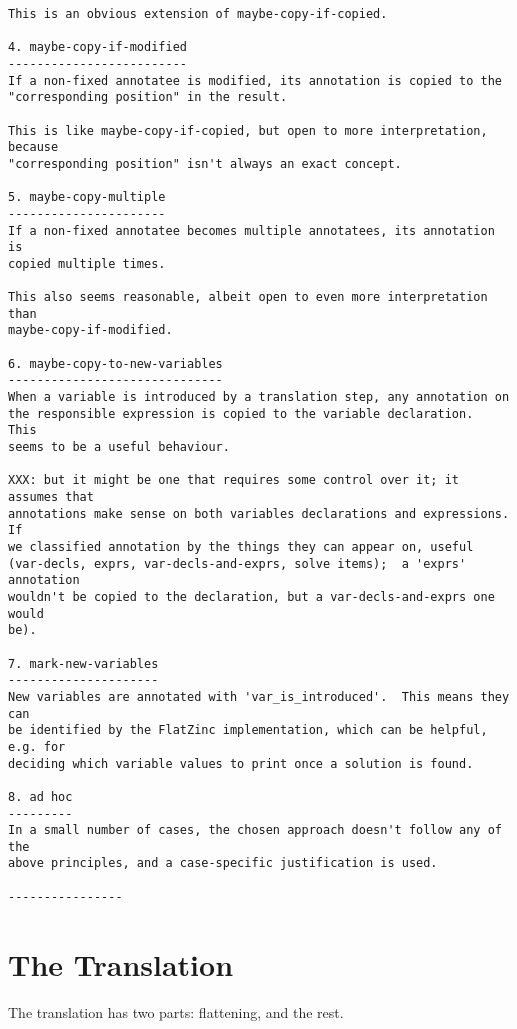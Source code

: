 \documentclass[10pt]{article}
\begin{document}
\begin{verbatim}
This is an obvious extension of maybe-copy-if-copied.

4. maybe-copy-if-modified
-------------------------
If a non-fixed annotatee is modified, its annotation is copied to the
"corresponding position" in the result.

This is like maybe-copy-if-copied, but open to more interpretation, because
"corresponding position" isn't always an exact concept.

5. maybe-copy-multiple
----------------------
If a non-fixed annotatee becomes multiple annotatees, its annotation is
copied multiple times.

This also seems reasonable, albeit open to even more interpretation than
maybe-copy-if-modified.

6. maybe-copy-to-new-variables
------------------------------
When a variable is introduced by a translation step, any annotation on
the responsible expression is copied to the variable declaration.  This
seems to be a useful behaviour.

XXX: but it might be one that requires some control over it; it assumes that
annotations make sense on both variables declarations and expressions.  If
we classified annotation by the things they can appear on, useful
(var-decls, exprs, var-decls-and-exprs, solve items);  a 'exprs' annotation
wouldn't be copied to the declaration, but a var-decls-and-exprs one would
be).

7. mark-new-variables
---------------------
New variables are annotated with 'var_is_introduced'.  This means they can
be identified by the FlatZinc implementation, which can be helpful, e.g. for
deciding which variable values to print once a solution is found.

8. ad hoc
---------
In a small number of cases, the chosen approach doesn't follow any of the
above principles, and a case-specific justification is used.

----------------
\end{verbatim}

\section{The Translation}
The translation has two parts:  flattening, and the rest.
\end{document}
